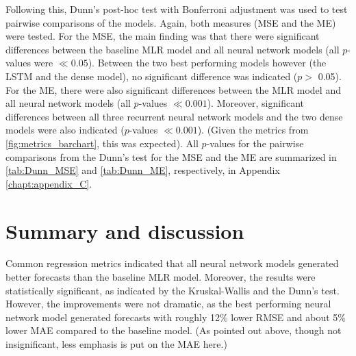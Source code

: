 Following this, Dunn's post-hoc test with Bonferroni adjustment was used to test pairwise comparisons of the models. Again, both measures (MSE and the ME) were tested. For the MSE, the main finding was that there were significant differences between the baseline MLR model and all neural network models (all $p$-values were $\ll0.05$). Between the two best performing models however (the LSTM and the dense model), no significant difference was indicated ($p> $ 0.05). For the ME, there were also significant differences between the MLR model and all neural network models (all $p$-values $\ll0.001$). Moreover, significant differences between all three recurrent neural network models and the two dense models were also indicated ($p$-values $\ll0.001$). (Given the metrics from \cref{fig:metrics_barchart}, this was expected). All $p$-values for the pairwise comparisons from the Dunn's test for the MSE and the ME are summarized in \cref{tab:Dunn_MSE} and \cref{tab:Dunn_ME}, respectively, in Appendix \ref{chapt:appendix_C}. 

\section{Summary and discussion}
Common regression metrics indicated that all neural network models generated better forecasts than the baseline MLR model. Moreover, the results were statistically significant, as indicated by the Kruskal-Wallis and the Dunn's test. However, the improvements were not dramatic, as the best performing neural network model generated forecasts with roughly 12\% lower RMSE and about 5\% lower MAE compared to the baseline model. (As pointed out above, though not insignificant, less emphasis is put on the MAE here.) 

